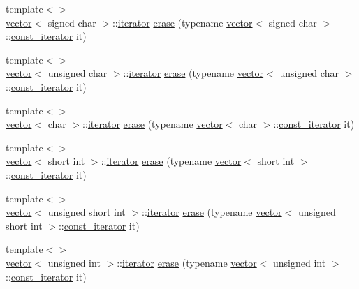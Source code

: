 \begin{DoxyCompactItemize}
\item 
{\footnotesize template$<$$>$ }\\\mbox{\hyperlink{classvector}{vector}}$<$ signed char $>$\+::\mbox{\hyperlink{classvector_a35c955cacac6aacaa1e82874b1628865}{iterator}} \mbox{\hyperlink{classvector_a67947ba7e1f06bd38647fc57735a2ca8}{erase}} (typename \mbox{\hyperlink{classvector}{vector}}$<$ signed char $>$\+::\mbox{\hyperlink{classvector_a2fc97dce62b7053449cc868607540dba}{const\+\_\+iterator}} it)
\item 
{\footnotesize template$<$$>$ }\\\mbox{\hyperlink{classvector}{vector}}$<$ unsigned char $>$\+::\mbox{\hyperlink{classvector_a35c955cacac6aacaa1e82874b1628865}{iterator}} \mbox{\hyperlink{classvector_aacf2fa7c57cf08dba49138da45d9a338}{erase}} (typename \mbox{\hyperlink{classvector}{vector}}$<$ unsigned char $>$\+::\mbox{\hyperlink{classvector_a2fc97dce62b7053449cc868607540dba}{const\+\_\+iterator}} it)
\item 
{\footnotesize template$<$$>$ }\\\mbox{\hyperlink{classvector}{vector}}$<$ char $>$\+::\mbox{\hyperlink{classvector_a35c955cacac6aacaa1e82874b1628865}{iterator}} \mbox{\hyperlink{classvector_ae0b9828d9c4aeb83ed094372bcdcccd7}{erase}} (typename \mbox{\hyperlink{classvector}{vector}}$<$ char $>$\+::\mbox{\hyperlink{classvector_a2fc97dce62b7053449cc868607540dba}{const\+\_\+iterator}} it)
\item 
{\footnotesize template$<$$>$ }\\\mbox{\hyperlink{classvector}{vector}}$<$ short int $>$\+::\mbox{\hyperlink{classvector_a35c955cacac6aacaa1e82874b1628865}{iterator}} \mbox{\hyperlink{classvector_a7eeef8d4a0151bdd583e95fe2ccfe40d}{erase}} (typename \mbox{\hyperlink{classvector}{vector}}$<$ short int $>$\+::\mbox{\hyperlink{classvector_a2fc97dce62b7053449cc868607540dba}{const\+\_\+iterator}} it)
\item 
{\footnotesize template$<$$>$ }\\\mbox{\hyperlink{classvector}{vector}}$<$ unsigned short int $>$\+::\mbox{\hyperlink{classvector_a35c955cacac6aacaa1e82874b1628865}{iterator}} \mbox{\hyperlink{classvector_a950d1cc93ba543ed6a8e198b9f4cef9c}{erase}} (typename \mbox{\hyperlink{classvector}{vector}}$<$ unsigned short int $>$\+::\mbox{\hyperlink{classvector_a2fc97dce62b7053449cc868607540dba}{const\+\_\+iterator}} it)
\item 
{\footnotesize template$<$$>$ }\\\mbox{\hyperlink{classvector}{vector}}$<$ unsigned int $>$\+::\mbox{\hyperlink{classvector_a35c955cacac6aacaa1e82874b1628865}{iterator}} \mbox{\hyperlink{classvector_afd5e956270cdd0c027040998cc1873e1}{erase}} (typename \mbox{\hyperlink{classvector}{vector}}$<$ unsigned int $>$\+::\mbox{\hyperlink{classvector_a2fc97dce62b7053449cc868607540dba}{const\+\_\+iterator}} it)

\end{DoxyCompactItemize}
